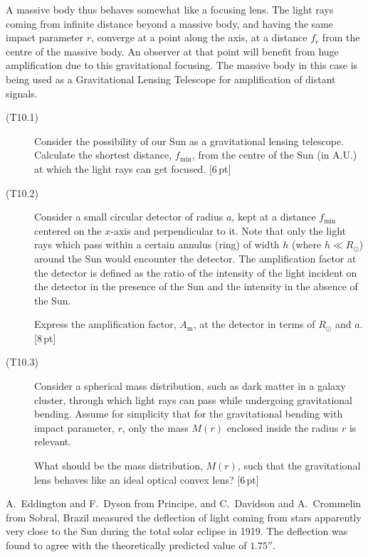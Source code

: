 
A massive body thus behaves somewhat like a focusing lens. The light rays
coming from infinite distance beyond a massive body, and having the same
impact parameter $r$, converge at a point along the axis, at a distance $f_r$
from the centre of the massive body. An observer at that point will benefit
from huge amplification due to this gravitational focusing. The massive body
in this case is being used as a Gravitational Lensing Telescope for
amplification of distant signals.

\begin{description}
\item[(T10.1)] Consider the possibility of our Sun as a gravitational lensing
  telescope. Calculate the shortest distance, $f_{\mathrm{min}}$, from the
  centre of the Sun (in A.U.) at which the light rays can get focused.
  \hfill[6\,pt]
\item[(T10.2)] Consider a small circular detector of radius $a$, kept at a
  distance $f_{\mathrm{min}}$ centered on the $x$-axis and perpendicular to
  it. Note that only the light rays which pass within a certain annulus (ring)
  of width $h$ (where $h \ll R_\odot$) around the Sun would encounter the
  detector. The amplification factor at the detector is defined as the ratio
  of the intensity of the light incident on the detector in the presence of
  the Sun and the intensity in the absence of the Sun.

  Express the amplification factor, $A_{\mathrm{m}}$, at the detector in terms
  of $R_\odot$ and $a$. \hfill[8\,pt]
\item[(T10.3)] Consider a spherical mass distribution, such as dark matter in
  a galaxy cluster, through which light rays can pass while undergoing
  gravitational bending. Assume for simplicity that for the gravitational
  bending with impact parameter, $r$, only the mass $M(r)$ enclosed inside the
  radius $r$ is relevant.

  What should be the mass distribution, $M(r)$, such that the gravitational
  lens behaves like an ideal optical convex lens? \hfill[6\,pt]
\end{description}

A.~Eddington and F.~Dyson from Principe, and C.~Davidson and A.~Crommelin from
Sobral, Brazil measured the deflection of light coming from stars apparently
very close to the Sun during the total solar eclipse in 1919. The deflection
was found to agree with the theoretically predicted value of $1.75''$.

